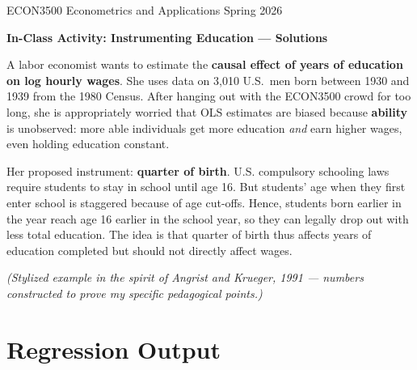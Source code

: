 \documentclass[11pt]{article}
\begin{document}
\thispagestyle{plain}
\singlespacing

ECON3500 Econometrics and Applications \hfill Spring 2026

\begin{center}
\Large{\textbf{In-Class Activity: Instrumenting Education --- Solutions}}\\[2pt]
\end{center}

\vspace{0.5em}

A labor economist wants to estimate the \textbf{causal effect of years of education on log hourly wages}. She uses data on 3{,}010 U.S.\ men born between 1930 and 1939 from the 1980 Census. After hanging out with the ECON3500 crowd for too long, she is appropriately worried that OLS estimates are biased because \textbf{ability} is unobserved: more able individuals get more education \textit{and} earn higher wages, even holding education constant.

Her proposed instrument: \textbf{quarter of birth}. U.S. compulsory schooling laws require students to stay in school until age 16. But students' age when they first enter school is staggered because of age cut-offs. Hence, students born earlier in the year reach age 16 earlier in the school year, so they can legally drop out with less total education. The idea is that quarter of birth thus affects years of education completed but should not directly affect wages.

\textit{(Stylized example in the spirit of Angrist and Krueger, 1991 --- numbers constructed to prove my specific pedagogical points.)}

\section*{Regression Output}
\end{document}
